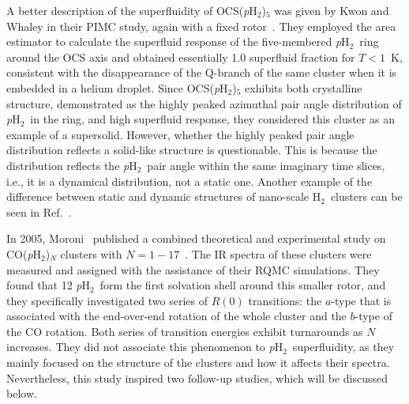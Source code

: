 \documentclass[12pt]{iopart}
\newcommand{\hydrogen}{H$_2$}
\newcommand{\phtwo}{{\em p}H$_2$}
\begin{document}
A better description of the superfluidity of OCS(\phtwo)$_5$ was given by Kwon and Whaley in their PIMC study, again with a fixed rotor~\cite{kwon_ocs_ph2_five}. 
They employed the area estimator to calculate the superfluid response of the five-membered \phtwo~ring around the OCS axis and obtained essentially 1.0 superfluid fraction for $T < 1$~K, consistent with the disappearance of the Q-branch of the same cluster when it is embedded in a helium droplet. 
Since OCS(\phtwo)$_5$ exhibits both crystalline structure, demonstrated as the highly peaked azimuthal pair angle distribution of \phtwo~in the ring, and high superfluid response, they considered this cluster as an example of a supersolid. 
However, whether the highly peaked pair angle distribution reflects a solid-like structure is questionable. 
This is because the distribution reflects the \phtwo~pair angle within the same imaginary time slices, i.e., it is a dynamical distribution, not a static one.
Another example of the difference between static and dynamic structures of nano-scale \hydrogen~clusters can be seen in Ref.~\cite{rabani_ph2_delocalization}.

In 2005, Moroni \etal~published a combined theoretical and experimental study on CO(\phtwo)$_N$ clusters with $N=1-17$~\cite{mroni_co_ph2_ir}. 
The IR spectra of these clusters were measured and assigned with the assistance of their RQMC simulations. 
They found that 12 \phtwo~form the first solvation shell around this smaller rotor, and they specifically investigated two series of $R(0)$ transitions: the $a$-type that is associated with the end-over-end rotation of the whole cluster and the $b$-type of the CO rotation. Both series of transition energies exhibit turnarounds as $N$ increases. They did not associate this phenomenon to \phtwo~superfluidity, as they mainly focused on the structure of the clusters and how it affects their spectra. 
Nevertheless, this study inspired two follow-up studies, which will be discussed below.
\end{document}
